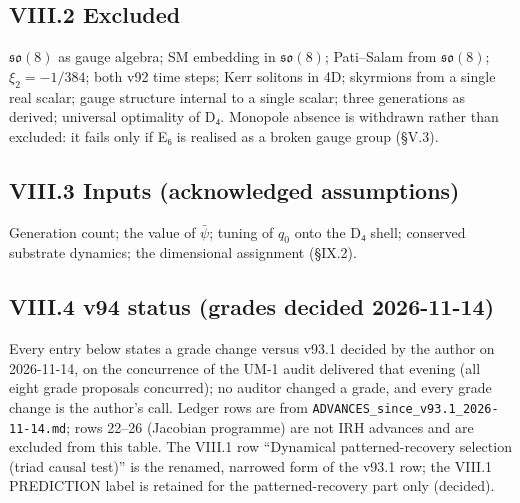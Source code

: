 \documentclass[a4paper,11pt]{article}
\begin{document}
\subsection*{VIII.2 Excluded}

$\mathfrak{so}(8)$ as gauge algebra; SM embedding in $\mathfrak{so}(8)$; Pati–Salam from $\mathfrak{so}(8)$; $\xi_2=-1/384$; both v92 time steps; Kerr solitons in 4D; skyrmions from a single real scalar; gauge structure internal to a single scalar; three generations as derived; universal optimality of D₄. Monopole absence is withdrawn rather than excluded: it fails only if E₆ is realised as a broken gauge group (§V.3).

\subsection*{VIII.3 Inputs (acknowledged assumptions)}

Generation count; the value of $\bar\psi$; tuning of $q_0$ onto the D₄ shell; conserved substrate dynamics; the dimensional assignment (§IX.2).
\subsection*{VIII.4 v94 status (grades decided 2026-11-14)}

Every entry below states a grade change versus v93.1 decided by the author on 2026-11-14, on the concurrence of the UM-1 audit delivered that evening (all eight grade proposals concurred); no auditor changed a grade, and every grade change is the author's call. Ledger rows are from \texttt{ADVANCES\_since\_v93.1\_2026-11-14.md}; rows 22--26 (Jacobian programme) are not IRH advances and are excluded from this table. The VIII.1 row ``Dynamical patterned-recovery selection (triad causal test)'' is the renamed, narrowed form of the v93.1 row; the VIII.1 PREDICTION label is retained for the patterned-recovery part only (decided).
\end{document}
